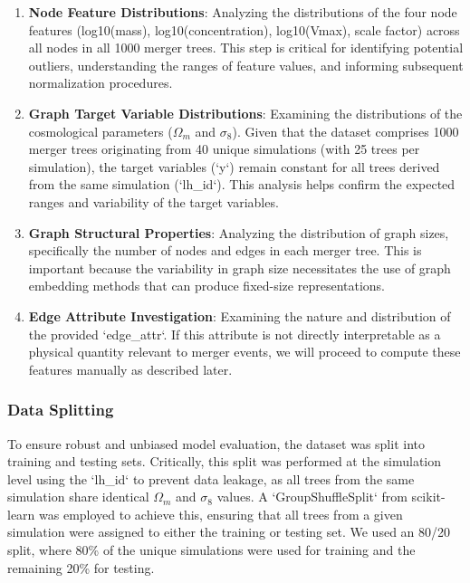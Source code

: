 \documentclass[twocolumn]{aastex631}
\begin{document}
\begin{enumerate}
    \item \textbf{Node Feature Distributions}: Analyzing the distributions of the four node features (log10(mass), log10(concentration), log10(Vmax), scale factor) across all nodes in all 1000 merger trees. This step is critical for identifying potential outliers, understanding the ranges of feature values, and informing subsequent normalization procedures.
    \item \textbf{Graph Target Variable Distributions}: Examining the distributions of the cosmological parameters ($\Omega_m$ and $\sigma_8$). Given that the dataset comprises 1000 merger trees originating from 40 unique simulations (with 25 trees per simulation), the target variables (`y`) remain constant for all trees derived from the same simulation (`lh\_id`). This analysis helps confirm the expected ranges and variability of the target variables.
    \item \textbf{Graph Structural Properties}: Analyzing the distribution of graph sizes, specifically the number of nodes and edges in each merger tree. This is important because the variability in graph size necessitates the use of graph embedding methods that can produce fixed-size representations.
    \item \textbf{Edge Attribute Investigation}: Examining the nature and distribution of the provided `edge\_attr`. If this attribute is not directly interpretable as a physical quantity relevant to merger events, we will proceed to compute these features manually as described later.
\end{enumerate}

\subsubsection{Data Splitting}
To ensure robust and unbiased model evaluation, the dataset was split into training and testing sets. Critically, this split was performed at the simulation level using the `lh\_id` to prevent data leakage, as all trees from the same simulation share identical $\Omega_m$ and $\sigma_8$ values. A `GroupShuffleSplit` from scikit-learn was employed to achieve this, ensuring that all trees from a given simulation were assigned to either the training or testing set. We used an 80/20 split, where 80\% of the unique simulations were used for training and the remaining 20\% for testing.
\end{document}
